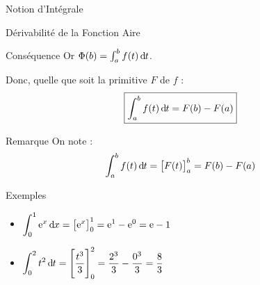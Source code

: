 \documentclass{coursbook}
\begin{document}
\begin{Gpartie}{Notion d'Intégrale}
\begin{Spartie}{Dérivabilité de la Fonction Aire}
\begin{SSpartie}{Conséquence}
                Or $\Phi(b)=\int_a^b f(t)\,\mathrm{d}\hspace*{-0.05em}t$.
                
                Donc, quelle que soit la primitive $F$ de $f$ : \[\boxed{\int_a^b f(t)\,\mathrm{d}\hspace*{-0.05em}t=F(b)-F(a)}\]
            \end{SSpartie}
            \begin{SSpartie}{Remarque} 
                On note : \[\int_a^b f(t)\,\mathrm{d}\hspace*{-0.05em}t=\big[F(t)\big]_a^b=F(b)-F(a)\]
            \end{SSpartie}
            \pagebreak
            \begin{SSpartie}{Exemples} 
                \begin{itemize}
                    \item $\displaystyle \int_0^1\mathrm{e}^x\,\mathrm{d}\hspace*{-0.05em}x=\big[\mathrm{e}^x\big]_0^1=\mathrm{e}^1-\mathrm{e}^0=\mathrm{e}-1$
                    \item $\displaystyle \int_0^2t^2\dt=\Bigg[\frac{t^3}{3}\Bigg]_0^2=\frac{2^3}{3}-\frac{0^3}{3}=\frac{8}{3}$
                \end{itemize}
            \end{SSpartie}
        \end{Spartie}
    \end{Gpartie}
\end{document}
